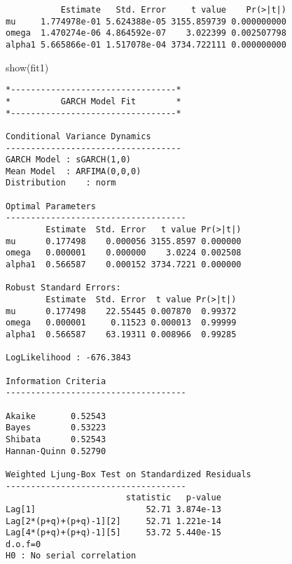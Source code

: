 \documentclass[
  ignorenonframetext,
]{beamer}
\newenvironment{Shaded}{\begin{snugshade}}{\end{snugshade}}
\newcommand{\FunctionTok}[1]{\textcolor[rgb]{0.00,0.00,0.00}{#1}}
\newcommand{\NormalTok}[1]{#1}
\newcommand{\SpecialCharTok}[1]{\textcolor[rgb]{0.00,0.00,0.00}{#1}}
\begin{document}
\begin{frame}[fragile]
\begin{Shaded}
\end{Shaded}

\begin{verbatim}
           Estimate   Std. Error     t value    Pr(>|t|)
mu     1.774978e-01 5.624388e-05 3155.859739 0.000000000
omega  1.470274e-06 4.864592e-07    3.022399 0.002507798
alpha1 5.665866e-01 1.517078e-04 3734.722111 0.000000000
\end{verbatim}

\begin{Shaded}
\begin{Highlighting}[]
\FunctionTok{show}\NormalTok{(fit1)}
\end{Highlighting}
\end{Shaded}

\begin{verbatim}
*---------------------------------*
*          GARCH Model Fit        *
*---------------------------------*

Conditional Variance Dynamics   
-----------------------------------
GARCH Model : sGARCH(1,0)
Mean Model  : ARFIMA(0,0,0)
Distribution    : norm 

Optimal Parameters
------------------------------------
        Estimate  Std. Error   t value Pr(>|t|)
mu      0.177498    0.000056 3155.8597 0.000000
omega   0.000001    0.000000    3.0224 0.002508
alpha1  0.566587    0.000152 3734.7221 0.000000

Robust Standard Errors:
        Estimate  Std. Error  t value Pr(>|t|)
mu      0.177498    22.55445 0.007870  0.99372
omega   0.000001     0.11523 0.000013  0.99999
alpha1  0.566587    63.19311 0.008966  0.99285

LogLikelihood : -676.3843 

Information Criteria
------------------------------------
                    
Akaike       0.52543
Bayes        0.53223
Shibata      0.52543
Hannan-Quinn 0.52790

Weighted Ljung-Box Test on Standardized Residuals
------------------------------------
                        statistic   p-value
Lag[1]                      52.71 3.874e-13
Lag[2*(p+q)+(p+q)-1][2]     52.71 1.221e-14
Lag[4*(p+q)+(p+q)-1][5]     53.72 5.440e-15
d.o.f=0
H0 : No serial correlation


\end{verbatim}
\end{frame}
\end{document}
